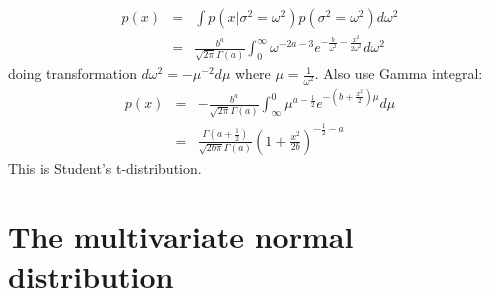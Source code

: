 \documentclass{article}
\begin{document}
\begin{enumerate}[(A)]
\begin{eqnarray}
p(x)&=&\int p(x|\sigma^2=\omega^2)p(\sigma^2=\omega^2)d\omega^2\nonumber\\
&=&\frac{b^a}{\sqrt{2\pi}\Gamma(a)}\int_0^{\infty} \omega^{-2a-3}e^{-\frac{b}{\omega^2}-\frac{x^2}{2\omega^2}}d\omega^2
\end{eqnarray}
doing transformation $d\omega^2=-\mu^{-2}d\mu$ where $\mu=\frac{1}{\omega^2}$. Also use Gamma integral:
\begin{eqnarray}
p(x)&=&-\frac{b^a}{\sqrt{2\pi}\Gamma(a)}\int_{\infty}^0\mu^{a-\frac{1}{2}}e^{-(b+\frac{x^2}{2})\mu}d\mu\nonumber\\
&=&\frac{\Gamma(a+\frac{1}{2})}{\sqrt{2b\pi}\Gamma(a)}(1+\frac{x^2}{2b})^{-\frac{1}{2}-a}
\end{eqnarray}
This is Student's t-distribution.

\end{enumerate}

\section{The multivariate normal distribution}
\end{document}
